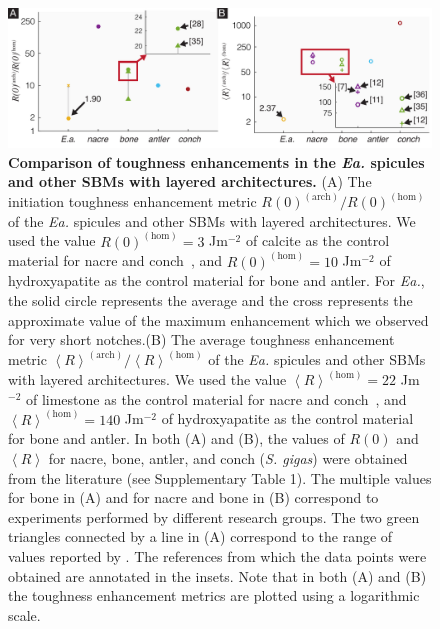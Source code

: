 \documentclass[12pt,onecolumn]{article}
\makeatletter
\newcommand{\EA}{\textit{Ea.\@}\xspace}
\makeatother
\begin{document}
			\begin{figure}[ht!]
			\centering
			\includegraphics[width=\textwidth]{../Figures/FigureSBMcomp/Figure6_V5.pdf}
			\caption{
			\textbf{Comparison of toughness enhancements in the \EA spicules and other SBMs with layered architectures.} (A)  The initiation toughness enhancement metric $R(0)^{(\mathrm{arch})}/R(0)^{(\mathrm{hom})}$ of the \EA spicules and other SBMs with layered architectures. We used the value $R(0)^{(\mathrm{hom})}=3$ Jm$^{-2}$ of calcite as the control material for nacre and conch~\cite{wegst2004mechanical}, and $R(0)^{(\mathrm{hom})}=10$ Jm$^{-2}$ of hydroxyapatite \cite{wegst2004mechanical} as the control material for bone and antler. For \EA, the solid circle represents the average and the cross represents the approximate value of the maximum enhancement which we observed for very short notches.(B) The average toughness enhancement metric $\left< R\right>^{(\mathrm{arch})}/\left< R\right>^{(\mathrm{hom})}$ of the \EA spicules and other SBMs with layered architectures. We used the value $\left< R\right>^{(\mathrm{hom})}=22$ Jm$^{-2}$ of limestone as the control material for nacre and conch~\cite{carmichael1982crc}, and $\left< R\right>^{(\mathrm{hom})}=140$ Jm$^{-2}$ of hydroxyapatite \cite{tenhuisen1995formation} as the control material for bone and antler. In both (A) and (B), the values of $R(0)$ and $\left< R \right>$ for nacre, bone, antler, and conch (\textit{S. gigas}) were obtained from the literature (see Supplementary Table 1). The multiple values for bone in (A) and for nacre and bone in (B) correspond to experiments performed by different research groups. The two green triangles connected by a line in (A) correspond to the range of values reported by \cite{koester2008true}. The references from which the data points were obtained are annotated in the insets. Note that in both (A) and (B) the toughness enhancement metrics are plotted using a logarithmic scale.
			}
			\label{fig:SBMcomp}
			\end{figure}

\end{document}
